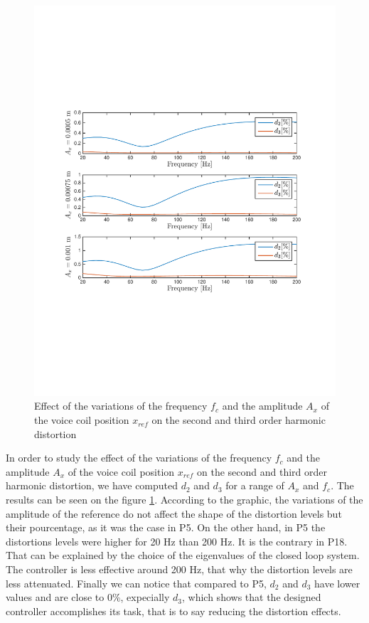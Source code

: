 \begin{figure}[H]
 \centering 
 \includegraphics[trim=2cm 7cm 2cm 7cm, clip=true, totalheight=0.35\textheight, angle=0]{figures/P18d2d3.pdf}
 \caption{Effect of the variations of the frequency $f_c$ and the amplitude $A_x$ of the voice coil position $x_{ref}$ on the second and third order harmonic distortion}
 \label{fig:d2d3P18}
\end{figure}

In order to study the effect of the variations of the frequency $f_c$ and the amplitude $A_x$ of the voice coil position $x_{ref}$ on the second and third order harmonic distortion, we have computed $d_2$ and $d_3$ for a range of $A_x$ and $f_c$. The results can be seen on the figure \ref{fig:d2d3P18}. According to the graphic, the variations of the amplitude of the reference do not affect the shape of the distortion levels but their pourcentage, as it was the case in P5. On the other hand, in P5 the distortions levels were higher for 20 Hz than 200 Hz. It is the contrary in P18. That can be explained by the choice of the eigenvalues of the closed loop system. The controller is less effective around 200 Hz, that why the distortion levels are less attenuated. Finally we can notice that compared to P5, $d_2$ and $d_3$ have lower values and are close to 0\%, expecially $d_3$, which shows that the designed controller accomplishes its task, that is to say reducing the distortion effects.